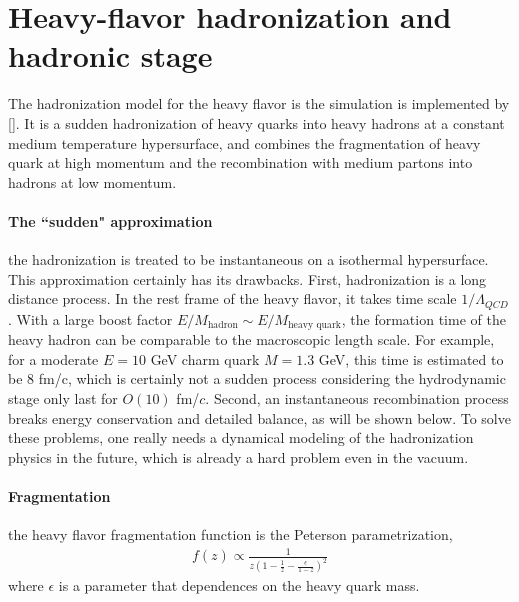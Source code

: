 \section{Heavy-flavor hadronization and hadronic stage}
The hadronization model for the heavy flavor is the simulation is implemented by [].
It is a sudden hadronization of heavy quarks into heavy hadrons at a constant medium temperature hypersurface, and combines the fragmentation of heavy quark at high momentum and the recombination with medium partons into hadrons at low momentum.

\paragraph{The ``sudden" approximation} the hadronization is treated to be instantaneous on a isothermal hypersurface.
This approximation certainly has its drawbacks.
First, hadronization is a long distance process. 
In the rest frame of the heavy flavor, it takes time scale $1/\Lambda_{QCD}$. 
With a large boost factor $E/M_{\textrm{hadron}}\sim E/M_{\textrm{heavy quark}}$, the formation time of the heavy hadron can be comparable to the macroscopic length scale.
For example, for a moderate $E=10$ GeV charm quark $M=1.3$ GeV, this time is estimated to be $8$ fm/c, which is certainly not a sudden process considering the hydrodynamic stage only last for $O(10)$ fm/$c$.
Second, an instantaneous recombination process breaks energy conservation and detailed balance, as will be shown below.
To solve these problems, one really needs a dynamical modeling of the hadronization physics in the future,
which is already a hard problem even in the vacuum.

\paragraph{Fragmentation} the heavy flavor fragmentation function is the Peterson parametrization,
\begin{eqnarray}
f(z) \propto \frac{1}{z(1-\frac{1}{z} - \frac{\epsilon}{1-z})^2}
\end{eqnarray}
where $\epsilon$ is a parameter that dependences on the heavy quark mass.
